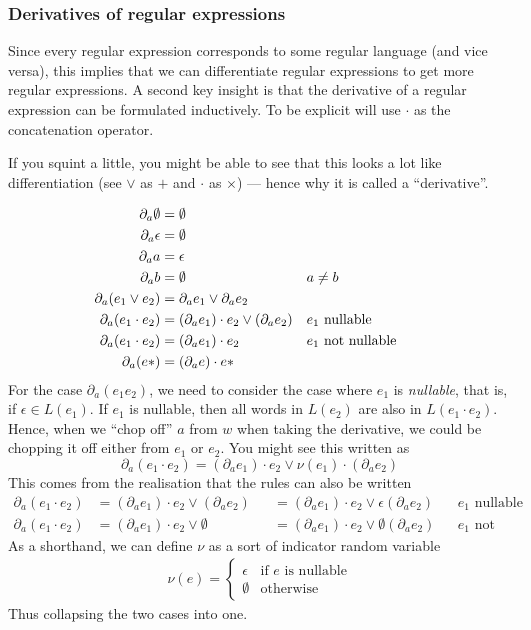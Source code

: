 \subsubsection{Derivatives of regular expressions}
Since every regular expression corresponds to some regular language (and vice versa), this implies that we can differentiate regular expressions to get more regular expressions. A second key insight is that the derivative of a regular expression can be formulated inductively. To be explicit will use $\cdot$ as the concatenation operator. 

If you squint a little, you might be able to see that this looks a lot like differentiation (see $\lor$ as $+$ and $\cdot$ as $\times$) --- hence why it is called a ``derivative''.

\[\begin{aligned}
\partial_a \emptyset & = \emptyset&&\\ 
\partial_a \epsilon & = \emptyset&&\\
\partial_a a & = \epsilon&&\\
\partial_a b & = \emptyset && a \neq b&&\\
\partial_a (e_1 \lor e_2) & = \partial_a e_1 \lor \partial_a e_2&&\\
\partial_a (e_1 \cdot e_2) & = (\partial_a e_1) \cdot e_2 \lor (\partial_a e_2) && e_1 \text{ nullable}&&\\
\partial_a (e_1 \cdot e_2) & = (\partial_a e_1) \cdot e_2 && e_1 \text{ not nullable}&&\\
\partial_a (e\*) & = (\partial_a e) \cdot e\*&&
\end{aligned}\]
For the case $\partial_a (e_1 e_2)$, we need to consider the case where $e_1$ is \emph{nullable}, that is, if $\epsilon \in L(e_1)$. If $e_1$ is nullable, then all words in $L(e_2)$ are also in $L(e_1 \cdot e_2)$. Hence, when we ``chop off'' $a$ from $w$ when taking the derivative, we could be chopping it off either from $e_1$ or $e_2$. You might see this written as 
\[ \partial_a (e_1 \cdot e_2) = (\partial_a e_1) \cdot e_2 \lor \nu(e_1) \cdot (\partial_a e_2)  \]
This comes from the realisation that the rules can also be written 
\begin{align*}
\partial_a (e_1 \cdot e_2) & = (\partial_a e_1) \cdot e_2 \lor (\partial_a e_2) &&= (\partial_a e_1) \cdot e_2 \lor \epsilon(\partial_a e_2) && e_1 \text{ nullable}&&\\
\partial_a (e_1 \cdot e_2) &= (\partial_a e_1) \cdot e_2 \lor \emptyset &&= (\partial_a e_1) \cdot e_2 \lor \emptyset(\partial_a e_2) && e_1 \text{ not nullable}&&
\end{align*}
As a shorthand, we can define $\nu$ as a sort of indicator random variable
\begin{align*}
    \nu(e) = \begin{cases} 
      \epsilon & \text{if $e$ is nullable} \\
      \emptyset & \text{otherwise}
   \end{cases}
\end{align*}
Thus collapsing the two cases into one.

